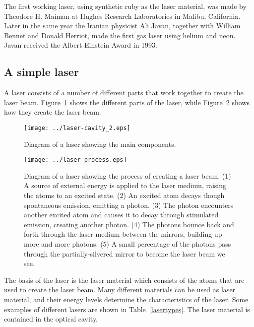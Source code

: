 \begin{IFact}
{The first working laser, using synthetic ruby as the laser material, was made by Theodore H. Maiman at Hughes Research Laboratories in Malibu, California. Later in the same year the Iranian physicist Ali Javan, together with William Bennet and Donald Herriot, made the first gas laser using helium and neon. Javan received the Albert Einstein Award in 1993.}
\end{IFact}


\subsection{A simple laser}


A laser consists of a number of different parts that work together to create the laser beam.  Figure~\ref{lasercavity} shows the different parts of the laser, while Figure~\ref{laserprocess} shows how they create the laser beam.\\

\begin{figure}[!htb]
\begin{center}
\texttt{[image: ../laser-cavity\_2.eps]}
\end{center}
\caption{Diagram of a laser showing the main components.}
\label{lasercavity}
\end{figure}


\begin{figure}[!tb]
\begin{center}
\texttt{[image: ../laser-process.eps]}
\end{center}
\caption{Diagram of a laser showing the process of creating a laser beam. (1) A source of external energy is applied to the laser medium, raising the atoms to an excited state. (2) An excited atom decays though spontaneous emission, emitting a photon.  (3) The photon encounters another excited atom and causes it to decay through stimulated emission, creating another photon. (4) The photons bounce back and forth through the laser medium between the mirrors, building up more and more photons.  (5) A small percentage of the photons pass through the partially-silvered mirror to become the laser beam we see.}
\label{laserprocess}
\end{figure}
 
The basis of the laser is the laser material which consists of the atoms that are used to create the laser beam. Many different materials can be used as laser material, and their energy levels determine the characteristics of the laser. Some examples of different lasers are shown in Table~\ref{lasertypes}. The laser material is contained in the optical cavity.\\ 
 
